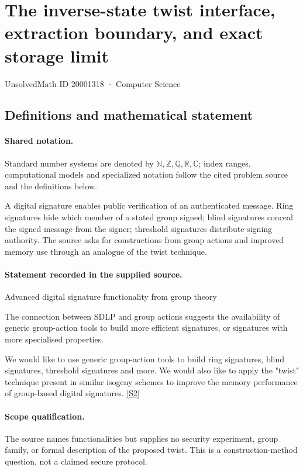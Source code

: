 \documentclass[11pt]{article}
\newcommand{\sref}[2]{\hyperlink{source:#1:#2}{[S#2]}}
\begin{document}
\setcounter{section}{20001317}
\section{The inverse-state twist interface, extraction boundary, and exact storage limit}\label{20001318}
{\small\sffamily UnsolvedMath ID 20001318 · Computer Science}
\subsection{Definitions and mathematical statement}

\paragraph{Shared notation.}Standard number systems are denoted by $\mathbb N,\mathbb Z,\mathbb Q,\mathbb R,\mathbb C$; index ranges, computational models and specialized notation follow the cited problem source and the definitions below.


A digital signature enables public verification of an authenticated message. Ring signatures hide which member of a stated group signed; blind signatures conceal the signed message from the signer; threshold signatures distribute signing authority. The source asks for constructions from group actions and improved memory use through an analogue of the twist technique.
\paragraph{Statement recorded in the supplied source.}
Advanced digital signature functionality from group theory

The connection between SDLP and group actions suggests the availability of generic group-action tools to build more efficient signatures, or signatures with more specialised properties.

We would like to use generic group-action tools to build ring signatures, blind signatures, threshold signatures and more. We would also like to apply the "twist" technique present in similar isogeny schemes to improve the memory performance of group-based digital signatures. \sref{20001318}{2}
\paragraph{Scope qualification.}
The source names functionalities but supplies no security experiment, group family, or formal description of the proposed twist. This is a construction-method question, not a claimed secure protocol.
\end{document}
